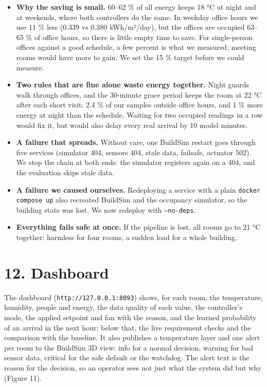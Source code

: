 \documentclass[11pt]{article}
\providecommand{\tightlist}{\setlength{\itemsep}{0pt}\setlength{\parskip}{0pt}}
\begin{document}
\begin{itemize}
\tightlist
\item \textbf{Why the saving is small.} 60--62 \% of all energy keeps 18 °C at night and at weekends,
  where both controllers do the same. In weekday office hours we use 11 \% less (0.339 vs 0.380
  kWh/m²/day), but the offices are occupied 63--65 \% of office hours, so there is little empty time
  to save. For single-person offices against a good schedule, a few percent is what we measured;
  meeting rooms would have more to gain. We set the 15 \% target before we could measure.
\item \textbf{Two rules that are fine alone waste energy together.} Night guards walk through
  offices, and the 30-minute grace period keeps the room at 22 °C after each short visit: 2.4 \% of
  our samples outside office hours, and 1 \% more energy at night than the schedule. Waiting for
  two occupied readings in a row would fix it, but would also delay every real arrival by 10 model
  minutes.
\item \textbf{A failure that spreads.} Without care, one BuildSim restart goes through five services
  (simulator 404, sensors 404, stale data, failsafe, actuator 502). We stop the chain at both ends:
  the simulator registers again on a 404, and the evaluation skips stale data.
\item \textbf{A failure we caused ourselves.} Redeploying a service with a plain \texttt{docker compose
  up} also recreated BuildSim and the occupancy simulator, so the building state was lost. We now
  redeploy with \texttt{--no-deps}.
\item \textbf{Everything fails safe at once.} If the pipeline is lost, all rooms go to 21 °C together:
  harmless for four rooms, a sudden load for a whole building.
\end{itemize}

\section{12. Dashboard}\label{dashboard}

The dashboard (\texttt{http://127.0.0.1:8093}) shows, for each room, the temperature, humidity,
people and energy, the data quality of each value, the controller's mode, the applied setpoint and
fan with the reason, and the learned probability of an arrival in the next hour; below that, the
live requirement checks and the comparison with the baseline. It also publishes a temperature layer
and one alert per room to the BuildSim 3D view: info for a normal decision, warning for bad sensor
data, critical for the safe default or the watchdog. The alert text is the reason for the decision,
so an operator sees not just what the system did but why (Figure 11).
\end{document}
